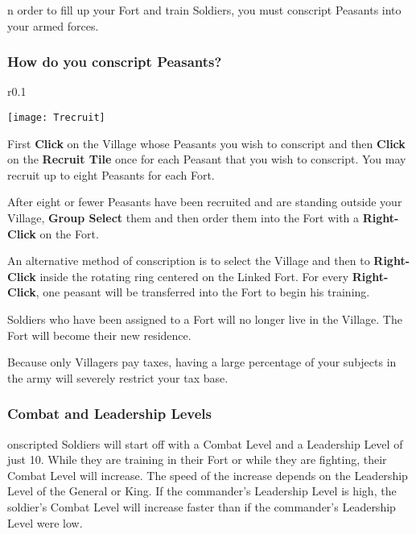 
n order to fill up your Fort and train Soldiers, you must conscript Peasants into your armed forces.

\subsubsection{\textsf{How do you conscript Peasants?}}

\begin{wrapfigure}{r}{0.1\textwidth}
    \vspace{-20pt}
    \begin{center}
        \texttt{[image: Trecruit]}
    \end{center}
    \vspace{-20pt}
\end{wrapfigure}

First \textbf{Click} on the Village whose Peasants you wish to conscript and then \textbf{Click} on the \textbf{Recruit Tile} once for each Peasant that you wish to conscript. You may recruit up to eight Peasants for each Fort.

After eight or fewer Peasants have been recruited and are standing outside your Village, \textbf{Group Select} them and then order them into the Fort with a \textbf{Right-Click} on the Fort.

An alternative method of conscription is to select the Village and then to \textbf{Right-Click} inside the rotating ring centered on the Linked Fort. For every \textbf{Right-Click}, one peasant will be transferred into the Fort to begin his training.

Soldiers who have been assigned to a Fort will no longer live in the Village. The Fort will become their new residence.

Because only Villagers pay taxes, having a large percentage of your subjects in the army will severely restrict your tax base.

\subsubsection{\textsf{Combat and Leadership Levels}}


onscripted Soldiers will start off with a Combat Level and a Leadership Level of just 10. While they are training in their Fort or while they are fighting, their Combat Level will increase. The speed of the increase depends on the Leadership Level of the General or King. If the commander’s Leadership Level is high, the soldier’s Combat Level will increase faster than if the commander’s Leadership Level were low.


